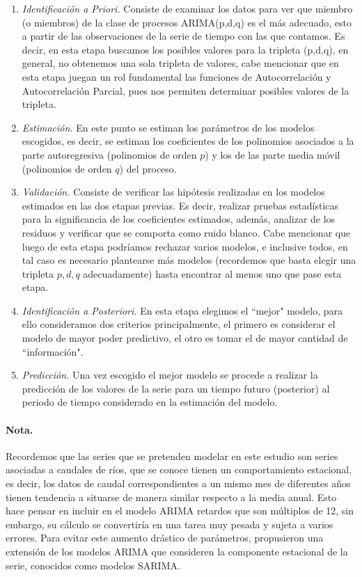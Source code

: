 \documentclass[12pt,oneside]{book}\usepackage[]{graphicx}\usepackage[]{color}
\theoremstyle{definition} %
\begin{document}
\begin{enumerate}
\item \textit{Identificación a Priori.} Consiste de examinar los datos para ver que miembro (o miembros) de la clase de procesos ARIMA(p,d,q) es el más adecuado, esto a partir de las observaciones de la serie de tiempo con las que contamos. Es decir, en esta etapa buscamos los posibles valores para la tripleta (p,d,q), en general, no obtenemos una sola tripleta de valores, cabe mencionar que en esta etapa juegan un rol fundamental las funciones de Autocorrelación y Autocorrelación Parcial, pues nos permiten determinar posibles valores de la tripleta.

\item \textit{Estimación.} En este punto se estiman los parámetros de los modelos escogidos, es decir, se estiman los coeficientes de los polinomios asociados a la parte autoregresiva (polinomios de orden $p$) y los de las parte media móvil (polinomios de orden $q$) del proceso.

\item \textit{Validación.} Consiste de verificar las hipótesis realizadas en los modelos estimados en las dos etapas previas. Es decir, realizar pruebas estadísticas para la significancia de los coeficientes estimados, además, analizar de los residuos y verificar que se comporta como ruido blanco. Cabe mencionar que luego de esta etapa podríamos rechazar varios modelos, e inclusive todos, en tal caso es necesario plantearse más modelos (recordemos que basta elegir una tripleta $p,d,q$ adecuadamente) hasta encontrar al menos uno que pase esta etapa.

\item \textit{Identificación a Posteriori.} En esta etapa elegimos el ``mejor" modelo, para ello consideramos dos criterios principalmente, el primero es considerar el modelo de mayor poder predictivo, el otro es  tomar el de mayor cantidad de ``información".

\item \textit{Predicción.} Una vez escogido el mejor modelo se procede a realizar la predicción de los valores de la serie para un tiempo futuro (posterior) al periodo de tiempo considerado en la estimación del modelo.


\end{enumerate}


\paragraph{Nota.}
Recordemos que las series que se pretenden modelar en este estudio son series asociadas a caudales de ríos, que se conoce tienen un comportamiento estacional, es decir, los datos de caudal correspondientes a un mismo mes de diferentes años tienen tendencia a situarse de manera similar respecto a la media anual. Esto hace pensar en incluir en el modelo ARIMA retardos que son múltiplos de 12, sin embargo, su cálculo se convertiría en una tarea muy pesada y sujeta a varios errores. Para evitar este aumento drástico de parámetros, \citeauthor{box2015time} propusieron una extensión de los modelos ARIMA que consideren la componente estacional de la serie, conocidos como modelos SARIMA.
\end{document}
